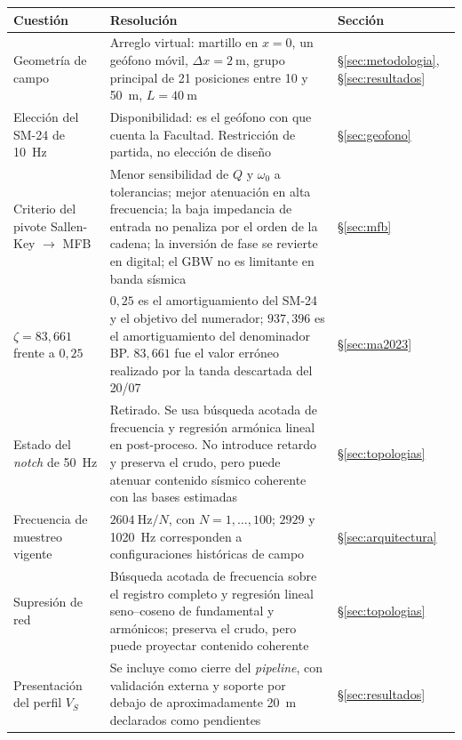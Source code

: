 \begin{center}\footnotesize
\begin{tabularx}{\textwidth}{@{}l X l@{}}
\toprule
\textbf{Cuesti\'on} & \textbf{Resoluci\'on} & \textbf{Secci\'on} \\
\midrule
Geometr\'ia de campo
& Arreglo virtual: martillo en $x=0$, un ge\'ofono m\'ovil, $\Delta x=\SI{2}{\meter}$, grupo principal de 21 posiciones entre \SI{10}{} y \SI{50}{\meter}, $L=\SI{40}{\meter}$
& \S\ref{sec:metodologia}, \S\ref{sec:resultados} \\
\addlinespace[2pt]
Elecci\'on del SM-24 de \SI{10}{\hertz}
& Disponibilidad: es el ge\'ofono con que cuenta la Facultad. Restricci\'on de partida, no elecci\'on de dise\~no
& \S\ref{sec:geofono} \\
\addlinespace[2pt]
Criterio del pivote Sallen-Key $\to$ MFB
& Menor sensibilidad de $Q$ y $\omega_0$ a tolerancias; mejor atenuaci\'on en alta frecuencia; la baja impedancia de entrada no penaliza por el orden de la cadena; la inversi\'on de fase se revierte en digital; el GBW no es limitante en banda s\'ismica
& \S\ref{sec:mfb} \\
\addlinespace[2pt]
$\zeta=83{,}661$ frente a $0{,}25$
& $0{,}25$ es el amortiguamiento del SM-24 y el objetivo del numerador; $937{,}396$ es el amortiguamiento del denominador BP. $83{,}661$ fue el valor err\'oneo realizado por la tanda descartada del 20/07
& \S\ref{sec:ma2023} \\
\addlinespace[2pt]
Estado del \emph{notch} de \SI{50}{\hertz}
& Retirado. Se usa b\'usqueda acotada de frecuencia y regresi\'on arm\'onica lineal en post-proceso. No introduce retardo y preserva el crudo, pero puede atenuar contenido s\'ismico coherente con las bases estimadas
& \S\ref{sec:topologias} \\
\addlinespace[2pt]
Frecuencia de muestreo vigente
& $\SI{2604}{\hertz}/N$, con $N=1,\ldots,100$; $2929$ y \SI{1020}{\hertz} corresponden a configuraciones hist\'oricas de campo
& \S\ref{sec:arquitectura} \\
\addlinespace[2pt]
Supresi\'on de red
& B\'usqueda acotada de frecuencia sobre el registro completo y regresi\'on lineal seno--coseno de fundamental y arm\'onicos; preserva el crudo, pero puede proyectar contenido coherente
& \S\ref{sec:topologias} \\
\addlinespace[2pt]
Presentaci\'on del perfil $V_S$
& Se incluye como cierre del \emph{pipeline}, con validaci\'on externa y soporte por debajo de aproximadamente \SI{20}{\meter} declarados como pendientes
& \S\ref{sec:resultados} \\

\end{tabularx}
\end{center}
